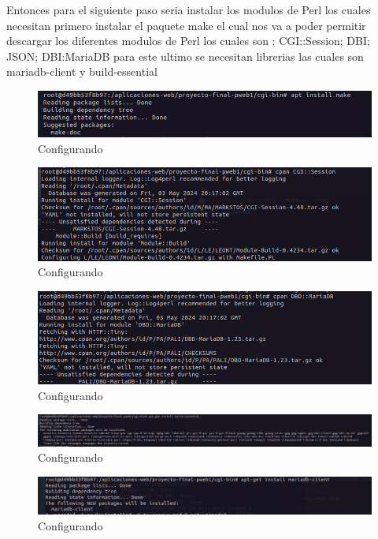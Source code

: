 Entonces para el siguiente paso seria instalar los modulos de Perl los cuales necesitan primero instalar el paquete make el cual nos va a poder permitir descargar 
los diferentes modulos de Perl los cuales son : CGI::Session; DBI; JSON; DBI:MariaDB para este ultimo se necesitan librerias las cuales son mariadb-client y build-essential
\begin{figure}[H]
  \centering
  \includegraphics[width=1.0\textwidth]{img/Instalar_make.png}
  \caption{Configurando}
\end{figure}
\begin{figure}[H]
  \centering
  \includegraphics[width=1.0\textwidth]{img/Instalando CGI_Session.png}
  \caption{Configurando}
\end{figure}
\begin{figure}[H]
  \centering
  \includegraphics[width=1.0\textwidth]{img/Instalando CGI_MariaDB.png}
  \caption{Configurando}
\end{figure}
\begin{figure}[H]
  \centering
  \includegraphics[width=1.0\textwidth]{img/Driver_MariaDB.png}
  \caption{Configurando}
\end{figure}
\begin{figure}[H]
  \centering
  \includegraphics[width=1.0\textwidth]{img/Driver_MariaDB_2.png}
  \caption{Configurando}
\end{figure}

